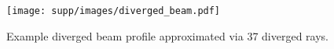 \begin{figure}[t]
\centering
\texttt{[image: supp/images/diverged\_beam.pdf]}
\caption{Example diverged beam profile approximated via 37 diverged rays.}
\label{fig:diverged_ray}
\end{figure}